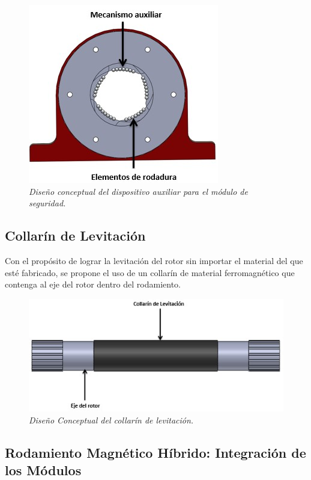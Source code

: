\begin{figure}[htb]
\centering
	\includegraphics[scale=.90]{images/Capitulo_2/MSG}
	\caption{\textit{Diseño conceptual del dispositivo auxiliar para el módulo de seguridad.}}
	\label{fig:system:example1}
\end{figure}

\subsection{Collarín de Levitación}

Con el propósito de lograr la levitación del rotor sin importar el material del que esté fabricado, se propone el uso de un collarín de material ferromagnético que contenga al eje del rotor dentro del rodamiento. 

\begin{figure}[htb]
\centering
	\includegraphics[scale=.90]{images/Capitulo_2/CL}
	\caption{\textit{Diseño Conceptual del collarín de levitación.}}
	\label{fig:system:example1}
\end{figure}

\subsection{Rodamiento Magnético Híbrido: Integración de los Módulos}

